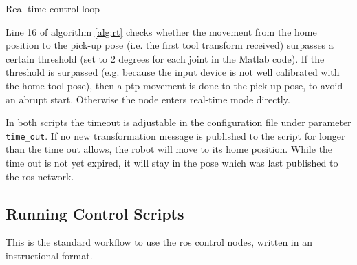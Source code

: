 \documentclass[headsepline,footinclude=false,fontsize=11pt,paper=a4,listof=totoc,bibliography=totoc,BCOR=12mm,DIV=14]{scrbook}
\begin{document}
\newpage
\begin{algorithm}[H]
\caption{Real-time control loop}
\label{alg:rt}
\end{algorithm}

\vspace{0.8cm}

Line 16 of algorithm \ref{alg:rt} checks whether the movement from the home position to the pick-up pose (i.e. the first tool transform received) surpasses a certain threshold (set to 2 degrees for each joint in the Matlab code). If the threshold is surpassed (e.g. because the input device is not well calibrated with the home tool pose), then a \gls{ptp} movement is done to the pick-up pose, to avoid an abrupt start. Otherwise the node enters real-time mode directly.

In both scripts the timeout is adjustable in the configuration file under parameter \texttt{time\_out}. If no new transformation message is published to the script for longer than the time out allows, the robot will move to its home position. While the time out is not yet expired, it will stay in the pose which was last published to the \gls{ros} network.

\subsection{Running Control Scripts}

This is the standard workflow to use the \gls{ros} control nodes, written in an instructional format. 
\end{document}
